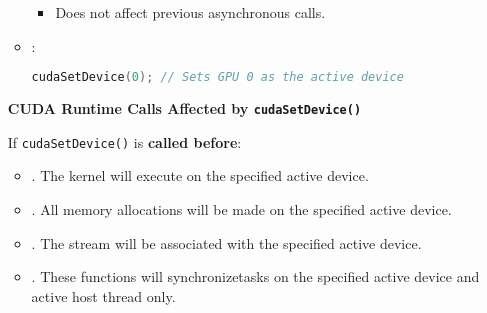 \begin{itemize}
\begin{itemize}
\begin{itemize}
            \item Does not affect previous asynchronous calls.
        \end{itemize}
        \item {}:
        \begin{lstlisting}[language=C++]
cudaSetDevice(0); // Sets GPU 0 as the active device\end{lstlisting}
    \end{itemize}
    \begin{flushleft}
      \textcolor{Green3}{ \textbf{CUDA Runtime Calls Affected by \texttt{cudaSetDevice()}}}
    \end{flushleft}
    If \texttt{cudaSetDevice()} is \textbf{called before}:
    \begin{itemize}
      \item {}. The kernel will execute on the specified active device.
      \item {}. All memory allocations will be made on the specified active device.
      \item {}. The stream will be associated with the specified active device.
      \item {}. These functions will synchronize\break tasks on the specified active device and active host thread only.
    \end{itemize}


\end{itemize}
